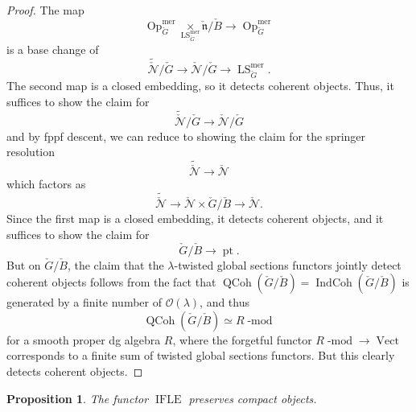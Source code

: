 \documentclass[10pt,a4paper]{amsart}
\newtheorem{prop}[subsubsection]{Proposition}
\newcommand{\on}[1]{\operatorname{#1}}
\newcommand{\QCoh}{\on{QCoh}}
\newcommand{\IndCoh}{\on{IndCoh}}
\newcommand{\Gcheck}{\check{G}}
\newcommand{\ncheck}{\check{\mathfrak{n}}}
\newcommand{\Bcheck}{\check{B}}
\begin{document}
\begin{proof}
    The map 
    $$
    \on{Op}_{\Gcheck}^{\on{mer}} \underset{\on{LS}_{\Gcheck}^{\on{mer}}}{\times} \ncheck/\Bcheck \longrightarrow \on{Op}_{\Gcheck}^{\on{mer}}
    $$
    is a base change of
    $$
    \tilde{\check{\mathcal{N}}}/\Gcheck \longrightarrow \check{\mathcal{N}}/\Gcheck \longrightarrow \on{LS}_{\Gcheck}^{\on{mer}}.
    $$
    The second map is a closed embedding, so it detects coherent objects. Thus, it suffices to show the claim for 
    $$
    \tilde{\check{\mathcal{N}}}/\Gcheck \longrightarrow \check{\mathcal{N}}/\Gcheck
    $$
    and by fppf descent, we can reduce to showing the claim for the springer resolution
    $$
    \tilde{\check{\mathcal{N}}} \longrightarrow \check{\mathcal{N}}
    $$
    which factors as
    $$
    \tilde{\check{\mathcal{N}}} \longrightarrow \check{\mathcal{N}} \times \Gcheck/\Bcheck \longrightarrow \check{\mathcal{N}}.
    $$
    Since the first map is a closed embedding, it detects coherent objects, and it suffices to show the claim for
    $$
    \Gcheck/\Bcheck \longrightarrow \on{pt}.
    $$
    But on $\Gcheck/\Bcheck$, the claim that the $\lambda$-twisted global sections functors jointly detect coherent objects follows from the fact that $\QCoh(\Gcheck/\Bcheck) = \IndCoh(\Gcheck/\Bcheck)$ is generated by a finite number of $\mathcal{O}(\lambda)$, and thus
    $$
    \QCoh(\Gcheck/\Bcheck) \simeq R\on{-mod}
    $$
    for a smooth proper dg algebra $R$, where the forgetful functor $R\on{-mod} \to \on{Vect}$ corresponds to a finite sum of twisted global sections functors. But this clearly detects coherent objects.
\end{proof}

\begin{prop}
The functor $\on{IFLE}$ preserves compact objects.
\end{prop}
\end{document}
